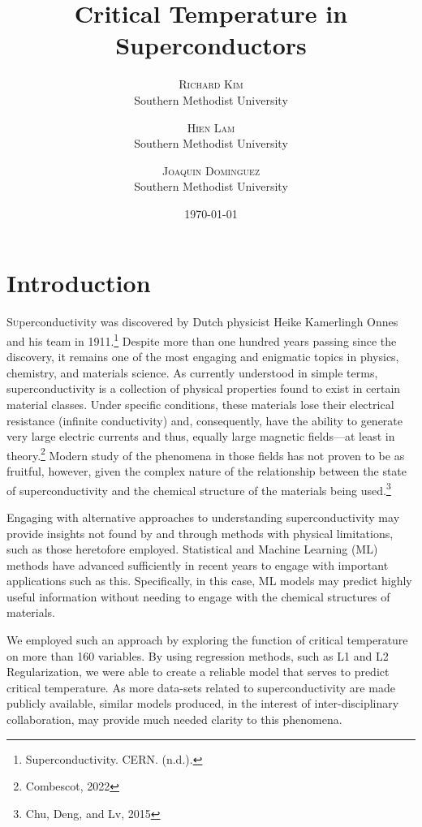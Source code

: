 \documentclass[twoside,twocolumn]{article}
\title{Critical Temperature in Superconductors} %
\author{%
\textsc{Richard Kim}\\[1ex] %
\normalsize Southern Methodist University \\ %
\and %
\textsc{Hien Lam} \\[1ex] %
\normalsize Southern Methodist University \\ %
\and %
\textsc{Joaquin Dominguez} \\[1ex] %
\normalsize Southern Methodist University \\ %
}
\date{\today} %
\begin{document}
\maketitle


\section{Introduction}

\lettrine[nindent=0em,lines=3]{S} uperconductivity was discovered by Dutch physicist Heike Kamerlingh Onnes and his team in 1911.\footnote{Superconductivity. CERN. (n.d.).} Despite more than one hundred years passing since the discovery, it remains one of the most engaging and enigmatic topics in physics, chemistry, and materials science. As currently understood in simple terms, superconductivity is a collection of physical properties found to exist in certain material classes. Under specific conditions, these materials lose their electrical resistance (infinite conductivity) and, consequently, have the ability to generate very large electric currents and thus, equally large magnetic fields---at least in theory.\footnote{Combescot, 2022} Modern study of the phenomena in those fields has not proven to be as fruitful, however, given the complex nature of the relationship between the state of superconductivity and the chemical structure of the materials being used.\footnote{Chu, Deng, and Lv, 2015} 

Engaging with alternative approaches to understanding superconductivity may provide insights not found by and through methods with physical limitations, such as those heretofore employed. Statistical and Machine Learning (ML) methods have advanced sufficiently in recent years to engage with important applications such as this. Specifically, in this case, ML models may predict highly useful information without needing to engage with the chemical structures of materials. 

We employed such an approach by exploring the function of critical temperature on more than 160 variables.
By using regression methods, such as L1 and L2 Regularization, we were able to create a reliable model that serves to predict critical temperature. As more data-sets related to superconductivity are made publicly available, similar models  produced, in the interest of inter-disciplinary collaboration, may provide much needed clarity to this phenomena.
\end{document}
